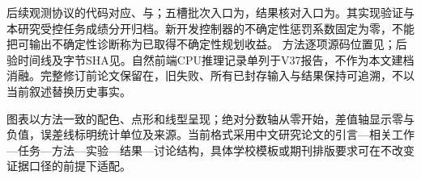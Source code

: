 \documentclass[11pt,a4paper]{article}
\begin{document}
后续观测协议的代码对应、与；五槽批次入口为，结果核对入口为。其实现验证与本研究受控任务成绩分开归档。新开发控制器的不确定性惩罚系数固定为零，不能把可输出不确定性诊断称为已取得不确定性规划收益。
方法逐项源码位置见；后验时间线及字节SHA见。自然前端CPU推理记录单列于V37报告，不作为本文建档消融。完整修订前论文保留在，旧失败、所有已封存输入与结果保持可追溯，不以当前叙述替换历史事实。

图表以方法一致的配色、点形和线型呈现；绝对分数轴从零开始，差值轴显示零与负值，误差线标明统计单位及来源。当前格式采用中文研究论文的引言—相关工作—任务—方法—实验—结果—讨论结构，具体学校模板或期刊排版要求可在不改变证据口径的前提下适配。
\end{document}
